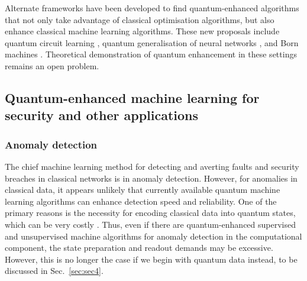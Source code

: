 \documentclass[twocolumn, aps, rmp, amsmath, amssymb, nofootinbib, superscriptaddress, longbibliography, floatfix, table-of-contents, eqsecnum]{revtex4}
\begin{document}
Alternate frameworks have been developed to find quantum-enhanced algorithms that not only take advantage of classical optimisation algorithms, but also enhance classical machine learning algorithms. These new proposals include quantum circuit learning \cite{bib:mitarai2018quantum}, quantum generalisation of neural networks \cite{wan2017quantum}, and Born machines \cite{bib:cheng2018information, bib:benedetti2018generative}. Theoretical demonstration of quantum enhancement in these settings remains an open problem.




\subsection{Quantum-enhanced machine learning for security and other applications}

\subsubsection{Anomaly detection}

The chief machine learning method for detecting and averting faults and security breaches in classical networks is in anomaly detection. However, for anomalies in classical data, it appears unlikely that currently available quantum machine learning algorithms can enhance detection speed and reliability. One of the primary reasons is the necessity for encoding classical data into quantum states, which can be very costly \cite{bib:aaronson2015read}. Thus, even if there are quantum-enhanced supervised and unsupervised machine algorithms for anomaly detection in the computational component, the state preparation and readout demands may be excessive. However, this is no longer the case if we begin with quantum data instead, to be discussed in Sec.~\ref{sec:sec4}.
\end{document}
